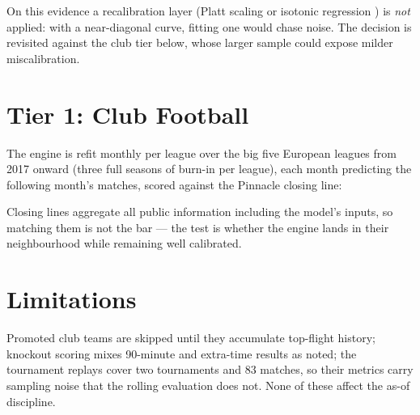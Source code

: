 \documentclass[11pt]{article}
\begin{document}
On this evidence a recalibration layer (Platt scaling \cite{platt1999} or
isotonic regression \cite{zadroznyelkan2002}) is \emph{not} applied: with a
near-diagonal curve, fitting one would chase noise. The decision is revisited
against the club tier below, whose larger sample could expose milder
miscalibration.

\section{Tier 1: Club Football}
The engine is refit monthly per league over the big five European leagues from
2017 onward (three full seasons of burn-in per league), each month predicting
the following month's matches, scored against the Pinnacle closing line:



Closing lines aggregate all public information including the model's inputs,
so matching them is not the bar --- the test is whether the engine lands in
their neighbourhood while remaining well calibrated.

\section{Limitations}
Promoted club teams are skipped until they accumulate top-flight history;
knockout scoring mixes 90-minute and extra-time results as noted; the
tournament replays cover two tournaments and 83 matches, so their metrics
carry sampling noise that the rolling evaluation does not. None of these
affect the as-of discipline.



\end{document}
